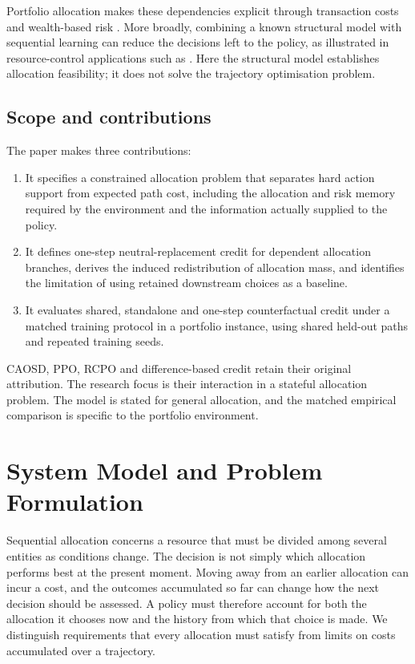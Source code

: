 \documentclass[10pt]{article}
\begin{document}
Portfolio allocation makes these dependencies explicit through transaction costs and wealth-based risk \citep{jiang2017,gollart2025}. More broadly, combining a known structural model with sequential learning can reduce the decisions left to the policy, as illustrated in resource-control applications such as \citet{ding2021}. Here the structural model establishes allocation feasibility; it does not solve the trajectory optimisation problem.

\subsection{Scope and contributions}

The paper makes three contributions:
\begin{enumerate}
  \item It specifies a constrained allocation problem that separates hard action support from expected path cost, including the allocation and risk memory required by the environment and the information actually supplied to the policy.
  \item It defines one-step neutral-replacement credit for dependent allocation branches, derives the induced redistribution of allocation mass, and identifies the limitation of using retained downstream choices as a baseline.
  \item It evaluates shared, standalone and one-step counterfactual credit under a matched training protocol in a portfolio instance, using shared held-out paths and repeated training seeds.
\end{enumerate}
CAOSD, PPO, RCPO and difference-based credit retain their original attribution. The research focus is their interaction in a stateful allocation problem. The model is stated for general allocation, and the matched empirical comparison is specific to the portfolio environment.

\section{System Model and Problem Formulation}
\label{sec:model}

Sequential allocation concerns a resource that must be divided among several entities as conditions change. The decision is not simply which allocation performs best at the present moment. Moving away from an earlier allocation can incur a cost, and the outcomes accumulated so far can change how the next decision should be assessed. A policy must therefore account for both the allocation it chooses now and the history from which that choice is made. We distinguish requirements that every allocation must satisfy from limits on costs accumulated over a trajectory.
\end{document}
